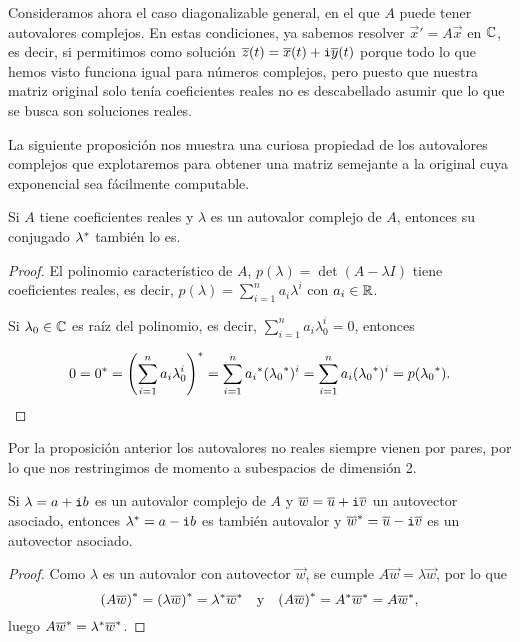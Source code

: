 \documentclass[../ecuaciones_diferenciales.tex]{subfiles}
\begin{document}
Consideramos ahora el caso diagonalizable general, en el que \(A\) puede tener
autovalores complejos. En estas condiciones, ya sabemos resolver 
\(\vec{x}' = A\vec{x}\) en \(\mathbb{C}\), es decir, si permitimos como solución 
\(\overline{z}(t) = \overline{x}(t) + \mathtt{i}\overline{y}(t)\) porque todo lo
que hemos visto funciona igual para números complejos, pero puesto que nuestra 
matriz original solo tenía coeficientes reales no es descabellado asumir que lo 
que se busca son soluciones reales.

La siguiente proposición nos muestra una curiosa
propiedad de los autovalores complejos que explotaremos para obtener una matriz
semejante a la original cuya exponencial sea fácilmente computable.

\begin{proposition}
	Si \(A\) tiene coeficientes reales y \(\lambda\) es un autovalor complejo 
	de \(A\), entonces su conjugado \({\lambda}^\ast\) también lo es.
\end{proposition}

\begin{proof}
	El polinomio característico de \(A\), \(p(\lambda) = \det(A - \lambda I)\)
	tiene coeficientes reales, es decir, \(p(\lambda) = \sum_{i=1}^n
	a_i\lambda^i\) con \(a_i \in \mathbb{R}\).

	Si \(\lambda_0 \in \mathbb{C}\) es raíz del polinomio, es decir, \(\sum_{i=1}^n
	a_i\lambda_0^i = 0\), entonces

	\[0 = \conjugate{0} = \conjugate{\parens{\sum_{i=1}^n a_i\lambda_0^i}} 
		= \sum_{i=1}^n \conjugate{a_i}(\conjugate{\lambda_0})^i 
		= \sum_{i=1}^n a_i(\conjugate{\lambda_0})^i 
		= p(\conjugate{\lambda_0}).\]
\end{proof}

Por la proposición anterior los autovalores no reales siempre vienen por pares,
por lo que nos restringimos de momento a subespacios de dimensión 2.

\begin{proposition}
	Si \(\lambda = a + \mathtt{i} b\) es un autovalor complejo de \(A\) y 
	\(\overline{w} = \overline{u} + \mathtt{i}\overline{v}\)
	un autovector asociado, entonces \({\lambda}^\ast = a - \mathtt{i} b\) 
	es también autovalor y \({\overline{w}}^\ast = \overline{u} - \mathtt{i} \overline{v}\) es un 
	autovector asociado.
\end{proposition}

\begin{proof}
	Como \(\lambda\) es un autovalor con autovector \(\vec{w}\), se cumple
	\(A\vec{w} = \lambda \vec{w}\), por lo que
	\[{(A\overline{w})}^\ast = {(\lambda \overline{w})}^\ast 
		= {\lambda}^\ast {\overline{w}}^\ast
		\quad \text{y} \quad
	{(A\overline{w})}^\ast = {A}^\ast {\overline{w}}^\ast 
		= A {\overline{w}}^\ast,\]
	luego \(A {\overline{w}}^\ast = {\lambda}^\ast {\overline{w}}^\ast\).
\end{proof}
\end{document}
